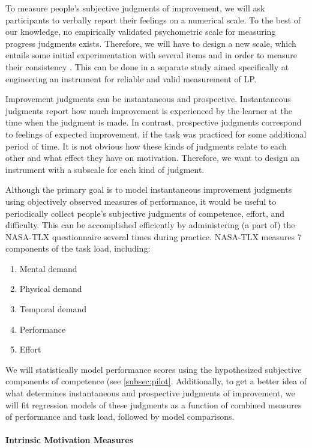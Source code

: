 To measure people's subjective judgments of improvement, we will ask participants to verbally report their feelings on a numerical scale. To the best of our knowledge, no empirically validated psychometric scale for measuring progress judgments exists. Therefore, we will have to design a new scale, which entails some initial experimentation with several items and in order to measure their consistency \cite{kline_psychological_2005,mcneish_thanks_2018}. This can be done in a separate study aimed specifically at engineering an instrument for reliable and valid measurement of \ac{LP}.

Improvement judgments can be instantaneous and prospective. Instantaneous judgments report how much improvement is experienced by the learner at the time when the judgment is made. In contrast, prospective judgments correspond to feelings of expected improvement, if the task was practiced for some additional period of time. It is not obvious how these kinds of judgments relate to each other and what effect they have on motivation. Therefore, we want to design an instrument with a subscale for each kind of judgment.

Although the primary goal is to model instantaneous improvement judgments using objectively observed measures of performance, it would be useful to periodically collect people's subjective judgments of competence, effort, and difficulty. This can be accomplished efficiently by administering (a part of) the NASA-TLX questionnaire \cite{hart_development_1988} several times during practice. NASA-TLX measures 7 components of the task load, including: 
\begin{enumerate}
  \item Mental demand
  \item Physical demand
  \item Temporal demand
  \item Performance
  \item Effort
\end{enumerate}
We will statistically model performance scores using the hypothesized subjective components of competence (see \autoref{subsec:pilot}. Additionally, to get a better idea of what determines instantaneous and prospective judgments of improvement, we will fit regression models of these judgments as a function of combined measures of performance and task load, followed by model comparisons. 

\paragraph{Intrinsic Motivation Measures}

